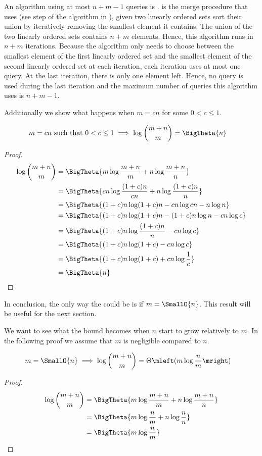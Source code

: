 An algorithm using at most \(n+m-1\) queries is \tapemerge. \tapemerge is the
merge procedure that \mergesort uses (see step  of the \mergesort
algorithm in ), \ie given two linearly ordered sets sort
their union by iteratively removing the smallest element it contains. The union
of the two linearly ordered sets contains \(n+m\) elements. Hence, this
algorithm runs in \(n+m\) iterations. Because the algorithm only needs to
choose between the smallest element of the first linearly ordered set and the
smallest element of the second linearly ordered set at each iteration, each
iteration uses at most one query. At the last iteration, there is only one
element left. Hence, no query is used during the last iteration and the maximum
number of queries this algorithm uses is \(n+m-1\).

Additionally we show what happens when \(m = c n\) for some \(0 < c \le 1\).
\begin{lemma}
\begin{align*}
m = c n \text{ such that } 0 < c \le 1 &\implies \log\binom{m+n}{m} = \BigTheta{n}
\end{align*}
\end{lemma}
\begin{proof}
\begin{align*}
\log\binom{m+n}{m} &= \BigTheta{m \log\frac{m+n}{m} + n \log\frac{m+n}{n}}\\
&= \BigTheta{cn \log\frac{(1+c)n}{cn} + n \log\frac{(1+c)n}{n}}\\
&= \BigTheta{(1+c)n \log (1+c)n - cn \log cn - n \log n}\\
&= \BigTheta{(1+c)n \log (1+c)n - (1+c)n \log n - cn \log c}\\
&= \BigTheta{(1+c)n \log \frac{(1+c)n}{n} - cn \log c}\\
&= \BigTheta{(1+c)n \log (1+c) - cn \log c}\\
&= \BigTheta{(1+c)n \log (1+c) + cn \log \frac{1}{c}}\\
&= \BigTheta{n}\qedhere
\end{align*}
\end{proof}

In conclusion, the only way the \ITLB could be  is if \(m =
\SmallO{n}\). This result will be useful for the next section.

We want to see what the bound becomes when $n$ start to grow relatively to
$m$. In the following proof we assume that $m$ is negligible compared to $n$.
\begin{lemma}
\begin{align*}
m = \SmallO{n} &\implies \log\binom{m+n}{m} = \Theta\mleft(m \log\frac{n}{m}\mright)
\end{align*}
\end{lemma}
\begin{proof}
\begin{align*}
\log\binom{m+n}{m} &= \BigTheta{m \log\frac{m+n}{m} + n \log\frac{m+n}{n}}\\
&= \BigTheta{m \log\frac{n}{m} + n \log\frac{n}{n}}\\
&= \BigTheta{m \log\frac{n}{m}}\qedhere
\end{align*}
\end{proof}

